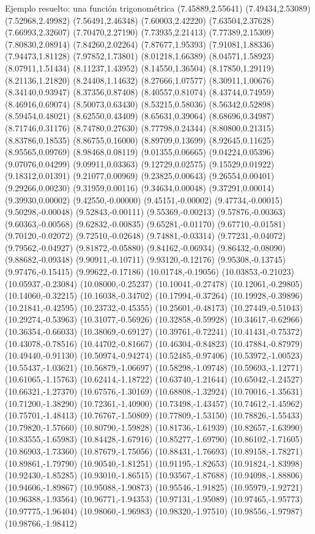 \documentclass[11pt,a4paper]{article}
\begin{document}
\begin{fmex}{Ejemplo resuelto: una función trigonométrica}
(7.45889,2.55641) (7.49434,2.53089) (7.52968,2.49982) (7.56491,2.46348) (7.60003,2.42220) (7.63504,2.37628) (7.66993,2.32607) (7.70470,2.27190) (7.73935,2.21413) (7.77389,2.15309) (7.80830,2.08914) (7.84260,2.02264) (7.87677,1.95393) (7.91081,1.88336) (7.94473,1.81128) (7.97852,1.73801) (8.01218,1.66389) (8.04571,1.58923) (8.07911,1.51434) (8.11237,1.43952) (8.14550,1.36504) (8.17850,1.29119) (8.21136,1.21820) (8.24408,1.14632) (8.27666,1.07577) (8.30911,1.00676) (8.34140,0.93947) (8.37356,0.87408) (8.40557,0.81074) (8.43744,0.74959) (8.46916,0.69074) (8.50073,0.63430) (8.53215,0.58036) (8.56342,0.52898) (8.59454,0.48021) (8.62550,0.43409) (8.65631,0.39064) (8.68696,0.34987) (8.71746,0.31176) (8.74780,0.27630) (8.77798,0.24344) (8.80800,0.21315) (8.83786,0.18535) (8.86755,0.16000) (8.89709,0.13699) (8.92645,0.11625) (8.95565,0.09769) (8.98468,0.08119) (9.01355,0.06665) (9.04224,0.05396) (9.07076,0.04299) (9.09911,0.03363) (9.12729,0.02575) (9.15529,0.01922) (9.18312,0.01391) (9.21077,0.00969) (9.23825,0.00643) (9.26554,0.00401) (9.29266,0.00230) (9.31959,0.00116) (9.34634,0.00048) (9.37291,0.00014) (9.39930,0.00002) (9.42550,-0.00000) (9.45151,-0.00002) (9.47734,-0.00015) (9.50298,-0.00048) (9.52843,-0.00111) (9.55369,-0.00213) (9.57876,-0.00363) (9.60363,-0.00568) (9.62832,-0.00835) (9.65281,-0.01170) (9.67710,-0.01581) (9.70120,-0.02072) (9.72510,-0.02648) (9.74881,-0.03314) (9.77231,-0.04072) (9.79562,-0.04927) (9.81872,-0.05880) (9.84162,-0.06934) (9.86432,-0.08090) (9.88682,-0.09348) (9.90911,-0.10711) (9.93120,-0.12176) (9.95308,-0.13745) (9.97476,-0.15415) (9.99622,-0.17186) (10.01748,-0.19056) (10.03853,-0.21023) (10.05937,-0.23084) (10.08000,-0.25237) (10.10041,-0.27478) (10.12061,-0.29805) (10.14060,-0.32215) (10.16038,-0.34702) (10.17994,-0.37264) (10.19928,-0.39896) (10.21841,-0.42595) (10.23732,-0.45355) (10.25601,-0.48173) (10.27449,-0.51043) (10.29274,-0.53963) (10.31077,-0.56926) (10.32858,-0.59928) (10.34617,-0.62966) (10.36354,-0.66033) (10.38069,-0.69127) (10.39761,-0.72241) (10.41431,-0.75372) (10.43078,-0.78516) (10.44702,-0.81667) (10.46304,-0.84823) (10.47884,-0.87979) (10.49440,-0.91130) (10.50974,-0.94274) (10.52485,-0.97406) (10.53972,-1.00523) (10.55437,-1.03621) (10.56879,-1.06697) (10.58298,-1.09748) (10.59693,-1.12771) (10.61065,-1.15763) (10.62414,-1.18722) (10.63740,-1.21644) (10.65042,-1.24527) (10.66321,-1.27370) (10.67576,-1.30169) (10.68808,-1.32924) (10.70016,-1.35631) (10.71200,-1.38290) (10.72361,-1.40900) (10.73498,-1.43457) (10.74612,-1.45962) (10.75701,-1.48413) (10.76767,-1.50809) (10.77809,-1.53150) (10.78826,-1.55433) (10.79820,-1.57660) (10.80790,-1.59828) (10.81736,-1.61939) (10.82657,-1.63990) (10.83555,-1.65983) (10.84428,-1.67916) (10.85277,-1.69790) (10.86102,-1.71605) (10.86903,-1.73360) (10.87679,-1.75056) (10.88431,-1.76693) (10.89158,-1.78271) (10.89861,-1.79790) (10.90540,-1.81251) (10.91195,-1.82653) (10.91824,-1.83998) (10.92430,-1.85285) (10.93010,-1.86515) (10.93567,-1.87688) (10.94098,-1.88806) (10.94606,-1.89867) (10.95088,-1.90873) (10.95546,-1.91825) (10.95979,-1.92721) (10.96388,-1.93564) (10.96771,-1.94353) (10.97131,-1.95089) (10.97465,-1.95773) (10.97775,-1.96404) (10.98060,-1.96983) (10.98320,-1.97510) (10.98556,-1.97987) (10.98766,-1.98412) 
\end{fmex}
\end{document}
